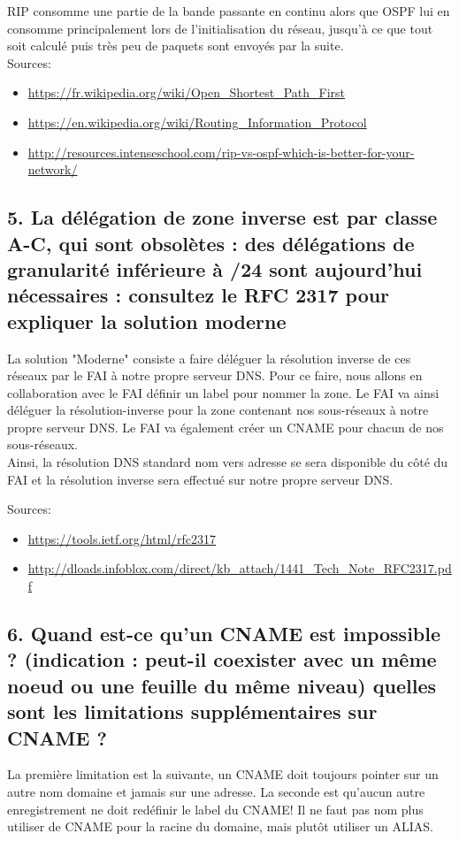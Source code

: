 \documentclass{article}
\begin{document}
RIP consomme une partie de la bande passante en continu alors que OSPF lui en consomme principalement lors de l'initialisation du réseau, jusqu'à ce que tout soit calculé puis très peu de paquets sont envoyés par la suite.\\

Sources:
\begin{itemize}
\item \url{https://fr.wikipedia.org/wiki/Open_Shortest_Path_First}
\item \url{https://en.wikipedia.org/wiki/Routing_Information_Protocol}
\item \url{http://resources.intenseschool.com/rip-vs-ospf-which-is-better-for-your-network/}
\end{itemize}

\subsection*{5. La délégation de zone inverse est par classe A-C, qui sont obsolètes : des délégations de granularité inférieure à /24 sont aujourd’hui nécessaires : consultez le RFC 2317 pour expliquer la solution moderne}
La solution "Moderne" consiste a faire déléguer la résolution inverse de ces réseaux par le FAI à notre propre serveur DNS. Pour ce faire, nous allons en collaboration avec le FAI définir un label pour nommer la zone. Le FAI va ainsi déléguer la résolution-inverse pour la zone contenant nos sous-réseaux à notre propre serveur DNS. Le FAI va également créer un CNAME pour chacun de nos sous-réseaux.\\

Ainsi, la résolution DNS standard nom vers adresse se sera disponible du côté du FAI et la résolution inverse sera effectué sur notre propre serveur DNS.

Sources:
\begin{itemize}
\item \url{https://tools.ietf.org/html/rfc2317}
\item \url{http://dloads.infoblox.com/direct/kb_attach/1441_Tech_Note_RFC2317.pdf}
\end{itemize}

\subsection*{6. Quand est-ce qu’un CNAME est impossible ? (indication : peut-il coexister avec un même noeud ou une feuille du même niveau) quelles sont les limitations supplémentaires sur CNAME ?}
La première limitation est la suivante, un CNAME doit toujours pointer sur un autre nom domaine et jamais sur une adresse. La seconde est qu'aucun autre enregistrement ne doit redéfinir le label du CNAME! Il ne faut pas nom plus utiliser de CNAME pour la racine du domaine, mais plutôt utiliser un ALIAS.\\
\end{document}
